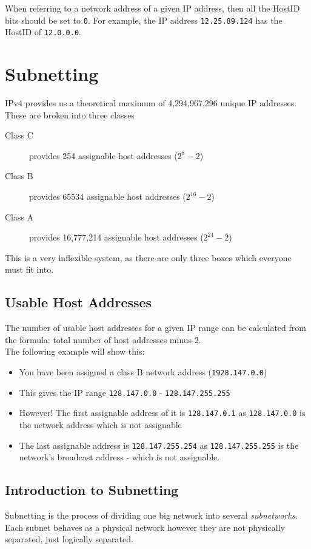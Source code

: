 When referring to a network address of a given IP address, then all the HostID bits should be set to \verb|0|. For example, the IP address \verb|12.25.89.124| has the HostID of \verb|12.0.0.0|.

\section{Subnetting}
IPv4 provides us a theoretical maximum of 4,294,967,296 unique IP addresses. These are broken into three classes
\begin{description}
    \item[Class C] provides 254 assignable host addresses ($2^8 - 2$)
    \item[Class B] provides 65534 assignable host addresses ($2^{16} - 2$)
    \item[Class A] provides 16,777,214 assignable host addresses ($2^{24} - 2$)
\end{description} 

This is a very inflexible system, as there are only three boxes which everyone must fit into.
\subsection{Usable Host Addresses}
The number of usable host addresses for a given IP range can be calculated from the formula: total number of host addresses minus 2.\\

The following example will show this:
\begin{itemize}
    \item You have been assigned a class B network address (\verb|1928.147.0.0|)
    \item This gives the IP range \verb|128.147.0.0| - \verb|128.147.255.255|
    \item However! The first assignable address of it is \verb|128.147.0.1| as \verb|128.147.0.0| is the network address which is not assignable
    \item The last assignable address is \verb|128.147.255.254| as \verb|128.147.255.255| is the network's broadcast address - which is not assignable.
\end{itemize}

\subsection{Introduction to Subnetting}
Subnetting is the process of dividing one big network into several \textit{subnetworks}. Each subnet behaves as a physical network however they are not physically separated, just logically separated.\\

